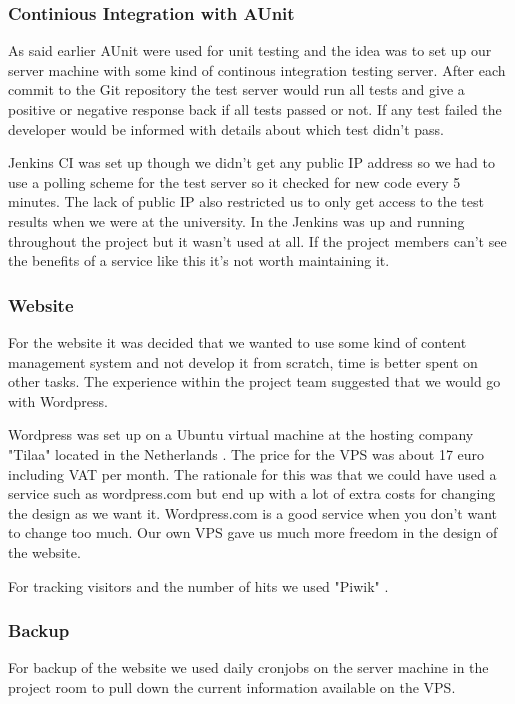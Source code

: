 \subsubsection{Continious Integration with AUnit}
As said earlier AUnit were used for unit testing and the idea was to set up
our server machine with some kind of continous integration testing server. After
each commit to the Git repository the test server would run all tests and give
a positive or negative response back if all tests passed or not. If any test failed
the developer would be informed with details about which test didn't pass.

Jenkins CI \cite{web:jenkins} was set up though we didn't get any public IP address so we had to use
a polling scheme for the test server so it checked for new code every 5 minutes.
The lack of public IP also restricted us to only get access to the test results
when we were at the university. In the Jenkins was up and running throughout the
project but it wasn't used at all. If the project members can't see the benefits
of a service like this it's not worth maintaining it.

\subsubsection{Website}
For the website it was decided that we wanted to use some kind of content management
system and not develop it from scratch, time is better spent on other tasks.
The experience within the project team suggested that we would go with Wordpress.

Wordpress was set up on a Ubuntu virtual machine at the hosting company "Tilaa"
located in the Netherlands \cite{web:tilaa}. The price for the VPS was about 17 euro
including VAT per month. The rationale for this was that we could have used a service such
as wordpress.com but end up with a lot of extra costs for changing the design as we
want it. Wordpress.com is a good service when you don't want to change too much.
Our own VPS gave us much more freedom in the design of the website.

For tracking visitors and the number of hits we used "Piwik" \cite{web:piwik}.

\subsubsection{Backup}
For backup of the website we used daily cronjobs on the server machine in the project
room to pull down the current information available on the VPS.
